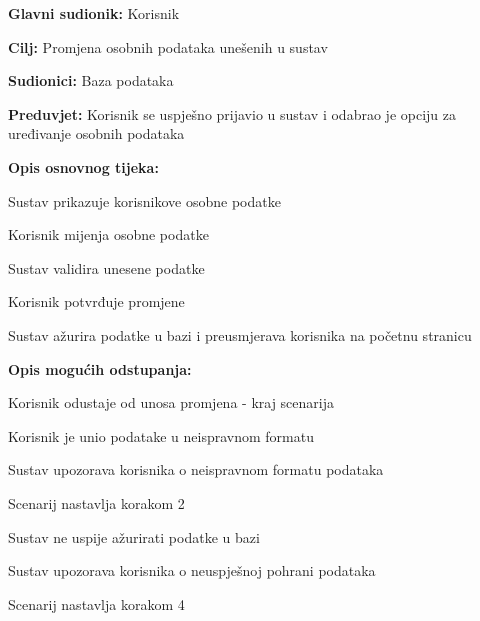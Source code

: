 					\noindent {}
					\begin{packed_item}
	
						\item \textbf{Glavni sudionik: }Korisnik
						\item  \textbf{Cilj:} Promjena osobnih podataka unešenih u sustav
						\item  \textbf{Sudionici:} Baza podataka
						\item  \textbf{Preduvjet:} Korisnik se uspješno prijavio u sustav i odabrao je opciju za uređivanje osobnih podataka
						\item  \textbf{Opis osnovnog tijeka:}
					
						\item[] \begin{packed_enum}
							\item Sustav prikazuje korisnikove osobne podatke 
							\item Korisnik mijenja osobne podatke
							\item Sustav validira unesene podatke
							\item Korisnik potvrđuje promjene
							\item Sustav ažurira podatke u bazi i preusmjerava korisnika na početnu stranicu
						\end{packed_enum}

						\item  \textbf{Opis mogućih odstupanja:}

						\item[] \begin{packed_item}
							\item[2.a] Korisnik odustaje od unosa promjena - kraj scenarija
							\item[3.a] Korisnik je unio podatake u neispravnom formatu
							\item[] \begin{packed_enum}
								\item Sustav upozorava korisnika o neispravnom formatu podataka
								\item Scenarij nastavlja korakom 2 
							\end{packed_enum}	
							\item[5.a] Sustav ne uspije ažurirati podatke u bazi
							\item[] \begin{packed_enum}
								\item Sustav upozorava korisnika o neuspješnoj pohrani podataka
								\item Scenarij nastavlja korakom 4
							\end{packed_enum}					
						\end{packed_item}
					\end{packed_item}	
					
